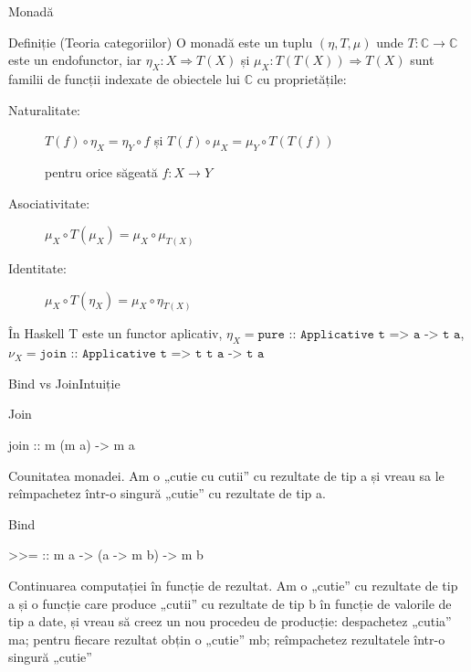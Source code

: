 \documentclass[xcolor=pdftex,romanian,colorlinks]{beamer}
\begin{document}
\begin{frame}{Monadă}
\begin{block}
{Definiție (Teoria categoriilor)}
O monadă este un tuplu $(\eta, T, \mu)$ unde $T : \mathbb{C} \rightarrow \mathbb{C}$ este un endofunctor, iar $\eta_X : X \Rightarrow T(X)$ și $\mu_X : T(T(X)) \Rightarrow T(X)$ sunt familii de funcții indexate de obiectele lui $\mathbb{C}$ cu proprietățile:
\begin{description}
\item[Naturalitate:] $T(f) \circ \eta_X = \eta_Y \circ f$
și $T(f)\circ \mu_X = \mu_Y \circ T(T(f))$

pentru orice săgeată $f : X \rightarrow Y$

\item[Asociativitate:] $\mu_X \circ T(\mu_X) = \mu_X \circ \mu_{T(X)}$

\item[Identitate:] $ \mu_X \circ T(\eta_X) = \mu_X\circ \eta_{T(X)}$

\end{description}
\end{block}

\begin{block}{În Haskell T este un functor aplicativ, $\eta_X = \texttt{pure :: Applicative t => a -> t a}$, $\nu_X = \texttt{join :: Applicative t => t t a -> t a} $}
\end{block}
\end{frame}


\begin{frame}[fragile]{Bind vs Join}{Intuiție}
\begin{block}{Join}
\begin{asciihs}
  join :: m (m a) -> m a
\end{asciihs}
Counitatea monadei. Am o „cutie cu cutii” cu rezultate de tip a și vreau sa le reîmpachetez într-o singură „cutie” cu rezultate de tip a.
\end{block}

\begin{block}{Bind}
\begin{asciihs}
  >>= :: m a -> (a -> m b) -> m b
\end{asciihs}
Continuarea computației în funcție de rezultat.
Am o „cutie” cu rezultate de tip a și o funcție care produce „cutii” cu rezultate de tip b în funcție de valorile de tip a date, și vreau să creez un nou procedeu de producție: despachetez „cutia” ma; pentru fiecare rezultat obțin  
o „cutie” mb; reîmpachetez rezultatele într-o singură „cutie”
\end{block}
\end{frame}
%
%
%
%
\end{document}
